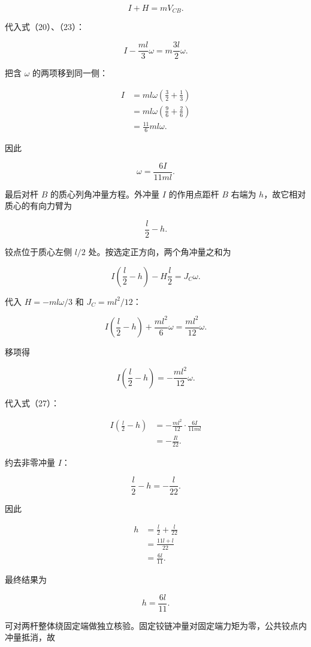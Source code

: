 \documentclass[12pt,a4paper,UTF8]{ctexart}
\begin{document}
\[
I+H=mV_{CB}. \tag{24}
\]

代入式（20）、（23）：

\[
I-\frac{ml}{3}\omega
=m\frac{3l}{2}\omega. \tag{25}
\]

把含 \(\omega\) 的两项移到同一侧：

\[
\begin{aligned}
I
&=ml\omega\left(\frac32+\frac13\right)\\
&=ml\omega\left(\frac96+\frac26\right)\\
&=\frac{11}{6}ml\omega.
\end{aligned} \tag{26}
\]

因此

\[
\omega=\frac{6I}{11ml}. \tag{27}
\]

最后对杆 \(B\) 的质心列角冲量方程。外冲量 \(I\) 的作用点距杆 \(B\)
右端为 \(h\)，故它相对质心的有向力臂为

\[
\frac l2-h. \tag{28}
\]

铰点位于质心左侧 \(l/2\) 处。按选定正方向，两个角冲量之和为

\[
I\left(\frac l2-h\right)
-H\frac l2
=J_C\omega. \tag{29}
\]

代入 \(H=-ml\omega/3\) 和 \(J_C=ml^2/12\)：

\[
I\left(\frac l2-h\right)
+\frac{ml^2}{6}\omega
=\frac{ml^2}{12}\omega. \tag{30}
\]

移项得

\[
I\left(\frac l2-h\right)
=-\frac{ml^2}{12}\omega. \tag{31}
\]

代入式（27）：

\[
\begin{aligned}
I\left(\frac l2-h\right)
&=-\frac{ml^2}{12}\cdot\frac{6I}{11ml}\\
&=-\frac{Il}{22}.
\end{aligned} \tag{32}
\]

约去非零冲量 \(I\)：

\[
\frac l2-h=-\frac l{22}. \tag{33}
\]

因此

\[
\begin{aligned}
h
&=\frac l2+\frac l{22}\\
&=\frac{11l+l}{22}\\
&=\frac{6l}{11}.
\end{aligned} \tag{34}
\]

最终结果为

\[
\boxed{h=\frac{6l}{11}}. \tag{35}
\]

可对两杆整体绕固定端做独立核验。固定铰链冲量对固定端力矩为零，公共铰点内冲量抵消，故
\end{document}
